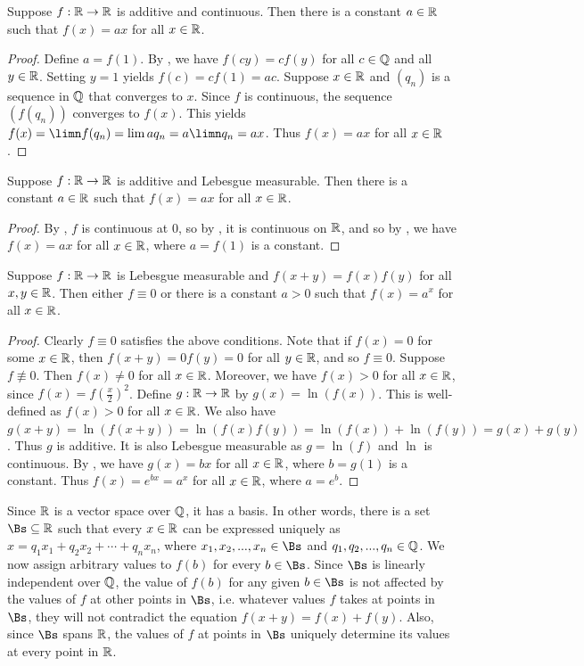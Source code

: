 \documentclass{article}
\begin{document}
\begin{proposition}\label{additivecont}
    Suppose $f:\R\to\R$ is additive and continuous. Then there is a constant $a\in\R$ such that $f(x)=ax$ for all $x\in\R$.
\end{proposition}
\begin{proof}
    Define $a=f(1)$. By , we have $f(cy)=cf(y)$ for all $c\in\Q$ and all $y\in\R$. Setting $y=1$ yields $f(c)=cf(1)=ac$. Suppose $x\in\R$ and $(q_n)$ is a sequence in $\Q$ that converges to $x$. Since $f$ is continuous, the sequence $(f(q_n))$ converges to $f(x)$. This yields $f(x)=\limn f(q_n)=\lim aq_n=a\limn q_n=ax$. Thus $f(x)=ax$ for all $x\in\R$.
\end{proof}

\begin{theorem}\label{additivelm}
    Suppose $f:\R\to\R$ is additive and Lebesgue measurable. Then there is a constant $a\in\R$ such that $f(x)=ax$ for all $x\in\R$.
\end{theorem}
\begin{proof}
    By , $f$ is continuous at $0$, so by , it is continuous on $\R$, and so by , we have $f(x)=ax$ for all $x\in\R$, where $a=f(1)$ is a constant.
\end{proof}

\begin{corollary}
    Suppose $f:\R\to\R$ is Lebesgue measurable and $f(x+y)=f(x)f(y)$ for all $x,y\in\R$. Then either $f\equiv0$ or there is a constant $a>0$ such that $f(x)=a^x$ for all $x\in\R$.
\end{corollary}
\begin{proof}
    Clearly $f\equiv0$ satisfies the above conditions. Note that if $f(x)=0$ for some $x\in\R$, then $f(x+y)=0f(y)=0$ for all $y\in\R$, and so $f\equiv0$. Suppose $f\not\equiv0$. Then $f(x)\ne0$ for all $x\in\R$. Moreover, we have $f(x)>0$ for all $x\in\R$, since $f(x)=f\left(\frac{x}{2}\right)^2$. Define $g:\R\to\R$ by $g(x)=\ln(f(x))$. This is well-defined as $f(x)>0$ for all $x\in\R$. We also have $g(x+y)=\ln(f(x+y))=\ln(f(x)f(y))=\ln(f(x))+\ln(f(y))=g(x)+g(y)$. Thus $g$ is additive. It is also Lebesgue measurable as $g=\ln(f)$ and $\ln$ is continuous. By , we have $g(x)=bx$ for all $x\in\R$, where $b=g(1)$ is a constant. Thus $f(x)=e^{bx}=a^x$ for all $x\in\R$, where $a=e^b$.
\end{proof}

Since $\R$ is a vector space over $\Q$, it has a basis. In other words, there is a set $\Bs\sub\R$ such that every $x\in\R$ can be expressed uniquely as $x=q_1x_1+q_2x_2+\cdots+q_nx_n$, where $x_1,x_2,...,x_n\in\Bs$ and $q_1,q_2,...,q_n\in\Q$. We now assign arbitrary values to $f(b)$ for every $b\in\Bs$. Since $\Bs$ is linearly independent over $\Q$, the value of $f(b)$ for any given $b\in\Bs$ is not affected by the values of $f$ at other points in $\Bs$, i.e. whatever values $f$ takes at points in $\Bs$, they will not contradict the equation $f(x+y)=f(x)+f(y)$. Also, since $\Bs$ spans $\R$, the values of $f$ at points in $\Bs$ uniquely determine its values at every point in $\R$.
\end{document}
